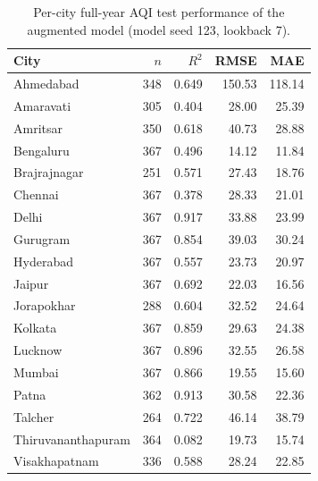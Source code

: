 \begin{table}[!htbp]
\centering
\caption{Per-city full-year AQI test performance of the augmented model (model seed 123, lookback 7).}\label{tab:cityaccuracy}
\setlength{\tabcolsep}{4pt}
\begin{tabular}{lrrrr}
\toprule
City & $n$ & $R^2$ & RMSE & MAE \\
\midrule
Ahmedabad & 348 & 0.649 & 150.53 & 118.14 \\
Amaravati & 305 & 0.404 & 28.00 & 25.39 \\
Amritsar & 350 & 0.618 & 40.73 & 28.88 \\
Bengaluru & 367 & 0.496 & 14.12 & 11.84 \\
Brajrajnagar & 251 & 0.571 & 27.43 & 18.76 \\
Chennai & 367 & 0.378 & 28.33 & 21.01 \\
Delhi & 367 & 0.917 & 33.88 & 23.99 \\
Gurugram & 367 & 0.854 & 39.03 & 30.24 \\
Hyderabad & 367 & 0.557 & 23.73 & 20.97 \\
Jaipur & 367 & 0.692 & 22.03 & 16.56 \\
Jorapokhar & 288 & 0.604 & 32.52 & 24.64 \\
Kolkata & 367 & 0.859 & 29.63 & 24.38 \\
Lucknow & 367 & 0.896 & 32.55 & 26.58 \\
Mumbai & 367 & 0.866 & 19.55 & 15.60 \\
Patna & 362 & 0.913 & 30.58 & 22.36 \\
Talcher & 264 & 0.722 & 46.14 & 38.79 \\
Thiruvananthapuram & 364 & 0.082 & 19.73 & 15.74 \\
Visakhapatnam & 336 & 0.588 & 28.24 & 22.85 \\
\bottomrule
\end{tabular}
\end{table}
